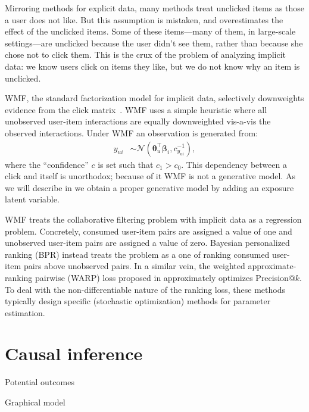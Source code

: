 Mirroring methods for explicit data, many methods treat unclicked items as those a user does not like.  But this assumption is mistaken, and overestimates the effect of the unclicked items.  Some of these
items---many of them, in large-scale settings---are unclicked because
the user didn't see them, rather than because she chose not to
click them.  This is the crux of the problem of analyzing implicit
data: we know users click on items they like, but we do not know why
an item is unclicked.

\gls{WMF}, the standard factorization model for implicit
data, selectively downweights evidence from the click
matrix~\citep{hu2008collaborative}.  \gls{WMF} uses a simple heuristic where all
unobserved user-item interactions are equally downweighted vis-a-vis the
observed interactions. Under \gls{WMF} an observation is generated from:
\begin{align*} 
y_{ui} &\sim \mathcal{N}(\boldsymbol\theta_u^\top\boldsymbol\beta_i, c^{-1}_{y_{ui}}),
\end{align*}
where the ``confidence'' $c$ is set such that $c_1 > c_0$. This dependency between a
click and itself is unorthodox; because of it \gls{WMF} is not a generative
model. As we will describe in  we obtain a proper generative
model by adding an exposure latent variable. 

\gls{WMF} treats the collaborative filtering problem with implicit data as a
regression problem. Concretely, consumed user-item pairs are assigned a
value of one and unobserved user-item pairs are assigned a value of zero.
Bayesian personalized ranking (BPR) \citep{rendle2009bpr,
rendle2014improving} instead treats the problem as a one of ranking
consumed user-item pairs above unobserved pairs.
In a similar vein, the weighted approximate-ranking pairwise (WARP) loss
proposed in \citet{weston2011wsabie} approximately optimizes Precision@$k$. 
To deal with the non-differentiable nature of the ranking
loss, these methods typically design specific (stochastic optimization)
methods for parameter estimation.


\section{Causal inference}\label{chpt:background:sec:causal}

\PP \citep{morgan2014counterfactuals}

\PP \citep{imbens2015causal}

\PP Potential outcomes \citep{rubin1974ece}

\PP Graphical model \citep{pearl2009causality}




